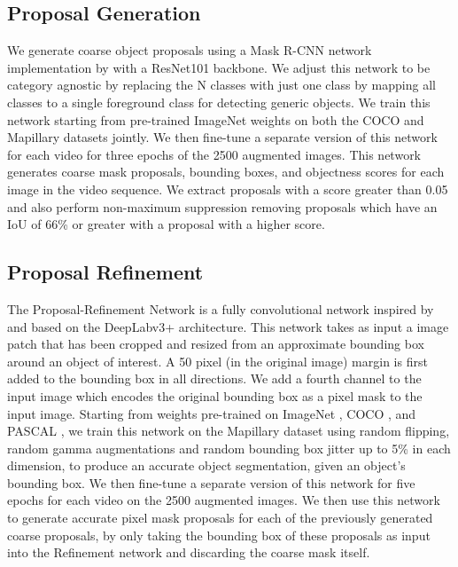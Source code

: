 \documentclass[runningheads]{llncs}
\begin{document}
\subsection{Proposal Generation}
We generate coarse object proposals using a Mask R-CNN \cite{he2017mask} network implementation by \cite{wu2016tensorpack} with a ResNet101 \cite{he2016deep} backbone. We adjust this network to be category agnostic by replacing the N classes with just one class by mapping all classes to a single foreground class for detecting generic objects. We train this network starting from pre-trained ImageNet \cite{Deng09CVPR} weights on both the COCO \cite{lin2014microsoft} and Mapillary \cite{neuhold2017mapillary} datasets jointly.  We then fine-tune a separate version of this network for each video for three epochs of the 2500 augmented images. This network generates coarse mask proposals, bounding boxes, and objectness scores for each image in the video sequence. We extract proposals with a score greater than 0.05 and also perform non-maximum suppression removing proposals which have an IoU of 66\% or greater with a proposal with a higher score.

\subsection{Proposal Refinement}
The Proposal-Refinement Network is a fully convolutional network inspired by \cite{xu17BMVC} and based on the DeepLabv3+ \cite{chen2018encoder} architecture. This network takes as input a  image patch that has been cropped and resized from an approximate bounding box around an object of interest. A 50 pixel (in the original image) margin is first added to the bounding box in all directions. We add a fourth channel to the input image which encodes the original bounding box as a pixel mask to the input image. Starting from weights pre-trained on ImageNet \cite{Deng09CVPR}, COCO \cite{lin2014microsoft}, and PASCAL \cite{Everingham10IJCV}, we train this network on the Mapillary \cite{neuhold2017mapillary} dataset using random flipping, random gamma augmentations and random bounding box jitter \cite{xu17BMVC} up to 5\% in each dimension, to produce an accurate object segmentation, given an object's bounding box. We then fine-tune a separate version of this network for five epochs for each video on the 2500 augmented images. We then use this network to generate accurate pixel mask proposals for each of the previously generated coarse proposals, by only taking the bounding box of these proposals as input into the Refinement network and discarding the coarse mask itself.
\end{document}
